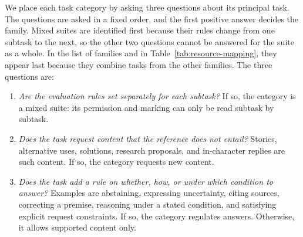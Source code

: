 \documentclass{clv2025}
\begin{document}
We place each task category by asking three questions about its principal
task. The questions are asked in a fixed order, and the first positive
answer decides the family. Mixed suites are identified first because their
rules change from one subtask to the next, so the other two questions
cannot be answered for the suite as a whole. In the list of families and
in Table~\ref{tab:resource-mapping}, they appear last because they combine
tasks from the other families. The three questions are:
\begin{enumerate}
\item \emph{Are the evaluation rules set separately for each subtask?}
If so, the category is a mixed suite: its permission and marking can only
be read subtask by subtask.
\item \emph{Does the task request content that the reference does not
entail?} Stories, alternative uses, solutions, research proposals, and
in-character replies are such content. If so, the category requests new
content.
\item \emph{Does the task add a rule on whether, how, or under which
condition to answer?} Examples are abstaining, expressing uncertainty,
citing sources, correcting a premise, reasoning under a stated condition,
and satisfying explicit request constraints. If so, the category regulates
answers. Otherwise, it allows supported content only.
\end{enumerate}
\end{document}

